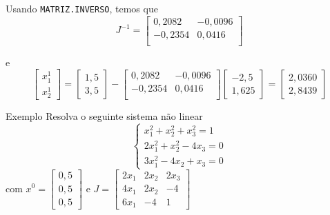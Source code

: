 \begin{frame}[c]
Usando \texttt{MATRIZ.INVERSO}, temos que
\[
J^{-1}=
\begin{bmatrix}
0,2082 &	-0,0096 \\
-0,2354	& 0,0416  \\
\end{bmatrix}
\]

e
\[
\begin{bmatrix}
x_1^1 \\ x_2^1
\end{bmatrix}
=
\begin{bmatrix}
1,5 \\ 3,5
\end{bmatrix}
-
\begin{bmatrix}
0,2082 &	-0,0096 \\
-0,2354	& 0,0416  \\
\end{bmatrix}
\begin{bmatrix}
-2,5 \\
1,625
\end{bmatrix}
=
\begin{bmatrix}
2,0360 \\
2,8439
\end{bmatrix}
\]
\end{frame}

\begin{frame}{Exemplo}
Resolva o seguinte sistema não linear 
\[
\begin{cases}
x_1^2+x_2^2+x_3^2=1 \\
2x_1^2+x_2^2-4x_3=0 \\
3x_1^2-4x_2+x_3=0
\end{cases}
\]
com
\(
x^0=
\begin{bmatrix}
0,5 \\ 0,5 \\ 0,5
\end{bmatrix}
\)
e
\(
J=
\begin{bmatrix}
2x_1 & 2x_2 & 2x_3 \\
4x_1 & 2x_2 & -4 \\
6x_1 & -4 & 1
\end{bmatrix}
\)
\end{frame}

